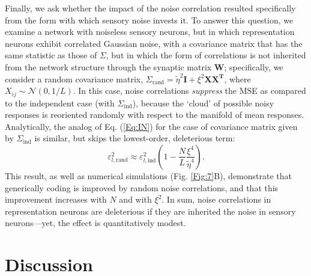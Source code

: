 \documentclass[a4paper]{article}%
\begin{document}
Finally, we ask whether the impact of the noise correlation resulted
specifically from the form with which sensory noise invests it. To answer this
question, we examine a network with noiseless sensory neurons, but in which
representation neurons exhibit correlated Gaussian noise, with a covariance
matrix that has the same statistic as those of $\Sigma$, but in which the form
of correlations is not inherited from the network structure through the
synaptic matrix $\mathbf{W}$; specifically, we consider a random covariance
matrix, $\Sigma_{\text{rand}}=\tilde{\eta}^{2}\mathbf{I}+\xi^{2}
\mathbf{XX^{T}}$, where $X_{ij}\sim\mathcal{N}(0,1/L)$. In this case, noise
correlations \textit{suppress} the MSE as compared to the independent case
(with $\Sigma_{\text{ind}}$), because the `cloud' of possible noisy responses
is reoriented randomly with respect to the manifold of mean responses.
Analytically, the analog of Eq. (\ref{Eq:IN}) for the case of covariance
matrix given by $\Sigma_{\text{ind}}$ is similar, but skips the lowest-order,
deleterious term:
\begin{equation}
\varepsilon_{l,\text{rand}}^{2}\approx\varepsilon_{l,\text{ind}}^{2}\left(
1-\frac{N}{L}\frac{\xi^{4}}{\tilde{\eta}^{4}}\right)  .\label{Eq:Rand}
\end{equation}
This result, as well as numerical simulations (Fig. \ref{Fig:7}B), demonstrate
that generically coding is improved by random noise correlations, and that
this improvement increases with $N$ and with $\xi^{2}$. In sum, noise
correlations in representation neurons are deleterious if they are inherited
the noise in sensory neurons---yet, the effect is quantitatively modest.

\section{Discussion}
\end{document}
